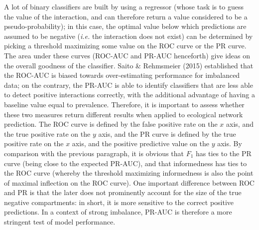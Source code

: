 \documentclass[10pt,oneside]{article}
\begin{document}
A lot of binary classifiers are built by using a regressor (whose task
is to guess the value of the interaction, and can therefore return a
value considered to be a pseudo-probability); in this case, the optimal
value below which predictions are assumed to be negative (\emph{i.e.}
the interaction does not exist) can be determined by picking a threshold
maximizing some value on the ROC curve or the PR curve. The area under
these curves (ROC-AUC and PR-AUC henceforth) give ideas on the overall
goodness of the classifier. Saito \& Rehmsmeier (2015) established that
the ROC-AUC is biased towards over-estimating performance for imbalanced
data; on the contrary, the PR-AUC is able to identify classifiers that
are less able to detect positive interactions correctly, with the
additional advantage of having a baseline value equal to prevalence.
Therefore, it is important to assess whether these two measures return
different results when applied to ecological network prediction. The ROC
curve is defined by the false positive rate on the \(x\) axis, and the
true positive rate on the \(y\) axis, and the PR curve is defined by the
true positive rate on the \(x\) axis, and the positive predictive value
on the \(y\) axis. By comparison with the previous paragraph, it is
obvious that \(F_1\) has ties to the PR curve (being close to the
expected PR-AUC), and that informedness has ties to the ROC curve
(whereby the threshold maximizing informedness is also the point of
maximal inflection on the ROC curve). One important difference between
ROC and PR is that the later does not prominently account for the size
of the true negative compartments: in short, it is more sensitive to the
correct positive predictions. In a context of strong imbalance, PR-AUC
is therefore a more stringent test of model performance.
\end{document}
